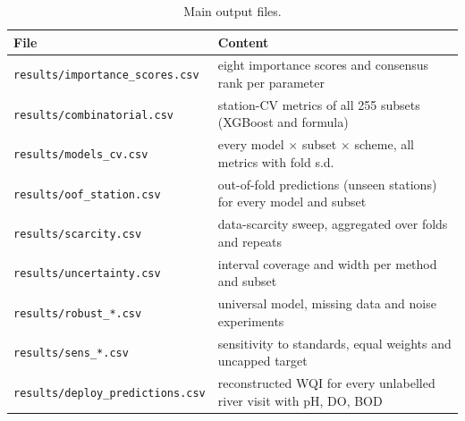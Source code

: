 \begin{table}[h]
\centering\small
\caption{Main output files.}
\begin{tabularx}{\textwidth}{lX}
\toprule
File & Content \\
\midrule
\texttt{results/importance\_scores.csv} & eight importance scores and consensus rank per parameter \\
\texttt{results/combinatorial.csv} & station-CV metrics of all 255 subsets (XGBoost and formula) \\
\texttt{results/models\_cv.csv} & every model $\times$ subset $\times$ scheme, all metrics with fold s.d. \\
\texttt{results/oof\_station.csv} & out-of-fold predictions (unseen stations) for every model and subset \\
\texttt{results/scarcity.csv} & data-scarcity sweep, aggregated over folds and repeats \\
\texttt{results/uncertainty.csv} & interval coverage and width per method and subset \\
\texttt{results/robust\_*.csv} & universal model, missing data and noise experiments \\
\texttt{results/sens\_*.csv} & sensitivity to standards, equal weights and uncapped target \\
\texttt{results/deploy\_predictions.csv} & reconstructed WQI for every unlabelled river visit with pH, DO, BOD \\
\bottomrule
\end{tabularx}
\end{table}
